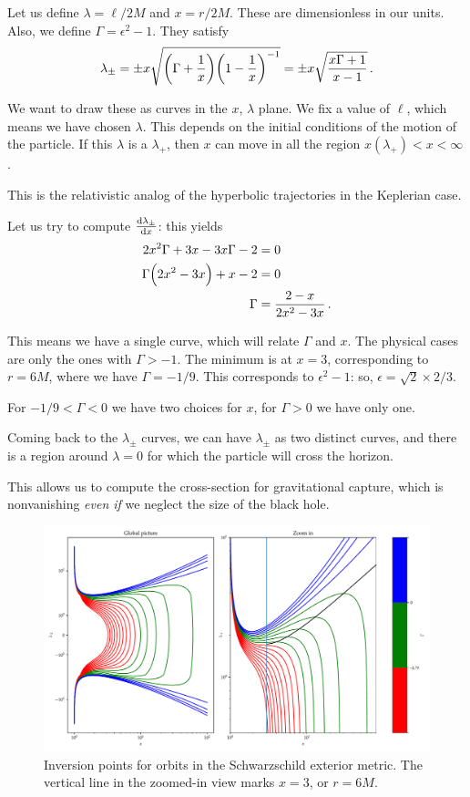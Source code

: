 \documentclass[main.tex]{subfiles}
\begin{document}
Let us define \(\lambda = \ell / 2M\) and \(x = r / 2M\). These are dimensionless in our units. Also, we define \(\Gamma = \epsilon^2- 1\). They satisfy 
%
\begin{align}
\lambda_{\pm} 
= \pm x \sqrt{\qty(\Gamma + \frac{1}{x}) \qty(1 - \frac{1}{x})^{-1}}
= \pm x \sqrt{\frac{x\Gamma + 1}{x-1}}
\,.
\end{align}

We want to draw these as curves in the  \(x\), \(\lambda \) plane. 
We fix a value of \(\ell\), which means we have chosen \(\lambda \). This depends on the initial conditions of the motion of the particle. 
If this \(\lambda \) is a \(\lambda _+\), then \(x\) can move in all the region \(x(\lambda _+)  < x < \infty \).

This is the relativistic analog of the hyperbolic trajectories in the Keplerian case. 

Let us try to compute \(\dv{\lambda_{\pm}}{x}\): this yields 
%
\begin{align}
2 x^2 \Gamma + 3 x - 3 x \Gamma - 2 &= 0 \\
\Gamma \qty(2 x^2 - 3x) + x-2 &= 0  \\
\Gamma &= \frac{2-x}{2 x^2 - 3x}
\,.
\end{align}

This means we have a single curve, which will relate \(\Gamma \) and \(x\). 
The physical cases are only the ones with \(\Gamma > -1\). 
The minimum is at \(x = 3\), corresponding to \(r = 6M\), where we have \(\Gamma = - 1 /9\). This corresponds to \(\epsilon^2 - 1\): so, \(\epsilon = \sqrt{2} \times 2/3 \).

For \(- 1/9 < \Gamma < 0\) we have two choices for \(x\), for \(\Gamma > 0\) we have only one. 

Coming back to the \(\lambda_{\pm}\) curves, we can have \(\lambda_{\pm}\) as two distinct curves, and there is a region around \(\lambda = 0\) for which the particle will cross the horizon. 

This allows us to compute the cross-section for gravitational capture, which is nonvanishing \emph{even if} we neglect the size of the black hole. 

\begin{figure}[ht]
\centering
\includegraphics[width=\textwidth]{figures/schwarzschild_orbit_inversions.pdf}
\caption{Inversion points for orbits in the Schwarzschild exterior metric. The vertical line in the zoomed-in view marks \(x =3\), or \(r = 6M\).}
\label{fig:schwarzschild-inversion}
\end{figure}
\end{document}
